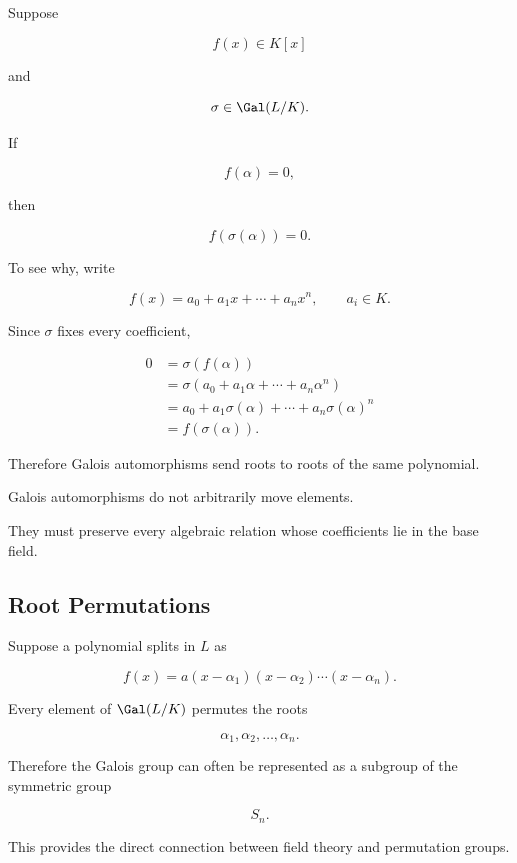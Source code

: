 Suppose

\[ f(x)\in K[x] \]

and

\[ \sigma\in\Gal(L/K). \]

If

\[ f(\alpha)=0, \]

then

\[ f(\sigma(\alpha))=0. \]

To see why, write

\[ f(x)=a_0+a_1x+\cdots+a_nx^n, \qquad a_i\in K. \]

Since \(\sigma\) fixes every coefficient,

\[
\begin{aligned}
0
&=\sigma(f(\alpha))\\
&=\sigma(a_0+a_1\alpha+\cdots+a_n\alpha^n)\\
&=a_0+a_1\sigma(\alpha)+\cdots+a_n\sigma(\alpha)^n\\
&=f(\sigma(\alpha)).
\end{aligned}
\]

Therefore Galois automorphisms send roots to roots of the same polynomial.

\begin{importantbox}
Galois automorphisms do not arbitrarily move elements.

They must preserve every algebraic relation whose coefficients lie in the
base field.
\end{importantbox}

\subsection{Root Permutations}
\label{subsec:galois-root-permutations}

Suppose a polynomial splits in \(L\) as

\[ f(x)=a(x-\alpha_1)(x-\alpha_2)\cdots(x-\alpha_n). \]

Every element of \(\Gal(L/K)\) permutes the roots

\[ \alpha_1,\alpha_2,\ldots,\alpha_n. \]

Therefore the Galois group can often be represented as a subgroup of the
symmetric group

\[ S_n. \]

This provides the direct connection between field theory and permutation
groups.

